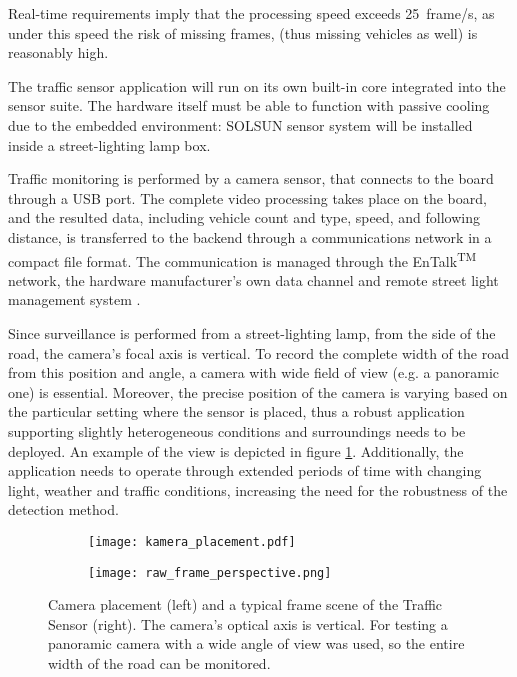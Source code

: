 Real-time requirements imply that the processing speed exceeds \SI{25}{frame/s}, as under this speed the risk of missing frames, (thus missing vehicles as well) is reasonably high.

The traffic sensor application will run on its own built-in core integrated into the sensor suite.
The hardware itself must be able to function with passive cooling due to the embedded environment: SOLSUN sensor system will be installed inside a street-lighting lamp box.

Traffic monitoring is performed by a camera sensor, that connects to the board through a USB port.
The complete video processing takes place on the board, and the resulted data, including vehicle count and type, speed, and following distance, is transferred to the backend through a communications network in a compact file format.
The communication is managed through the EnTalk\textsuperscript{TM} network, the hardware manufacturer's own data channel and remote street light management system \cite{EnTalk}.

Since surveillance is performed from a street-lighting lamp, from the side of the road, the camera's focal axis is vertical.
To record the complete width of the road from this position and angle, a camera with wide field of view (e.g. a panoramic one) is essential.
Moreover, the precise position of the camera is varying based on the particular setting where the sensor is placed, thus a robust application supporting slightly heterogeneous conditions and surroundings needs to be deployed. 
An example of the view is depicted in figure \ref{fig:camera_position}.
Additionally, the application needs to operate through extended periods of time with changing light, weather and traffic conditions, increasing the need for the robustness of the detection method.

\begin{figure}
	\centering
	\begin{subfigure}[b]{.47\textwidth}
		\centering
		\texttt{[image: kamera\_placement.pdf]}
	\end{subfigure}%
	\begin{subfigure}[b]{.47\textwidth}
		\centering
		\texttt{[image: raw\_frame\_perspective.png]}
	\end{subfigure}
	\caption[Camera placement and typical frame scene of the Traffic Sensor]{Camera placement (left) and a typical frame scene of the Traffic Sensor (right). The camera's optical axis is vertical. For testing a panoramic camera with a wide angle of view was used, so the entire width of the road can be monitored.}
	\label{fig:camera_position}
\end{figure}

